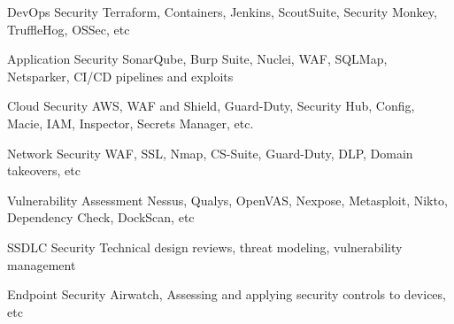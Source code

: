 
\begin{cvskills}

  \cvskill
    {DevOps Security} %
    {Terraform, Containers, Jenkins, ScoutSuite, Security Monkey, TruffleHog, OSSec, etc} %

  \cvskill
    {Application Security} %
    {SonarQube, Burp Suite, Nuclei, WAF, SQLMap, Netsparker, CI/CD pipelines and exploits } %

  \cvskill
    {Cloud Security} %
    {AWS, WAF and Shield, Guard-Duty, Security Hub, Config, Macie, IAM, Inspector, Secrets Manager, etc.} %

  \cvskill
    {Network Security} %
    {WAF, SSL, Nmap, CS-Suite, Guard-Duty, DLP, Domain takeovers, etc } %

  \cvskill
    {Vulnerability Assessment } %
    {Nessus, Qualys, OpenVAS, Nexpose, Metasploit, Nikto, Dependency Check, DockScan, etc } %

  \cvskill
    {SSDLC Security}
    {Technical design reviews, threat modeling, vulnerability management} %

  \cvskill
    {Endpoint Security} %
    {Airwatch, Assessing and applying security controls to devices, etc } 

\end{cvskills}
